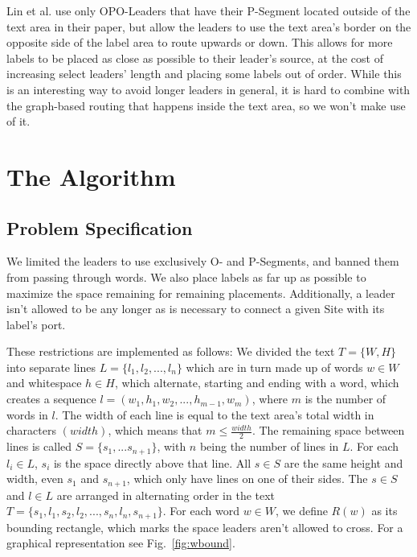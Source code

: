 \documentclass[11pt,a4paper]{vutinfth}
\begin{document}
Lin et al.\cite{Lin2009} use only OPO-Leaders that have their P-Segment located outside of the text area in their paper, but allow the leaders to use the text area's border on the opposite side of the label area to route upwards or down. This allows for more labels to be placed as close as possible to their leader's source, at the cost of increasing select leaders' length and placing some labels out of order. While this is an interesting way to avoid longer leaders in general, it is hard to combine with the graph-based routing that happens inside the text area, so we won't make use of it.


\chapter{The Algorithm}
\section{Problem Specification}
\label{sec:ProbSpec}
We limited the leaders to use exclusively O- and P-Segments, and banned them from passing through words. We also place labels as far up as possible to maximize the space remaining for  remaining placements. Additionally, a leader isn't allowed to be any longer as is necessary to connect a given Site with its label's port.

These restrictions are implemented as follows: We divided the text $T=\{W,H\}$ into separate lines $L=\{l_1 ,l_2 , ... ,l_n\}$ which are in turn made up of words $w \in W$ and whitespace $h \in H$, which alternate, starting and ending with a word, which creates a sequence $l=(w_1,h_1,w_2, ... , h_{m-1},w_m)$, where $m$ is the number of words in $l$. The width of each line is equal to the text area's total width in characters $(width)$, which means that $m \leq \frac{width}{2}$. The remaining space between lines is called $S=\{s_1, ... s_{n+1}\}$, with $n$ being the number of lines in $L$. For each $l_i \in L$,  $s_i$ is the space directly above that line. All $s \in S$ are the same height and width, even $s_1$ and $s_{n+1}$, which only have lines on one of their sides. The $s \in S$ and $l \in L$ are arranged in alternating order in the text $T=\{s_1, l_1, s_2, l_2, ..., s_n, l_n, s_{n+1}\}$.  For each word $w \in W$, we define $R(w)$  as its bounding rectangle, which marks the space leaders aren't allowed to cross. For a graphical representation see Fig.~\ref{fig:wbound}.
\end{document}
